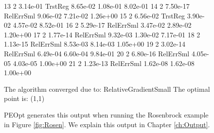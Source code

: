 \begin{figure}
\begin{lstPeopt}
13        2         3.14e-01  TrstReg   8.65e-02  1.08e-01  8.02e-01  
14        2         7.50e-17  RelErrSml 9.06e-02  7.21e-02  1.26e+00  
15        2         6.56e-02  TrstReg   3.90e-02  4.57e-02  8.52e-01  
16        2         5.29e-17  RelErrSml 3.47e-02  2.89e-02  1.20e+00  
17        2         1.77e-14  RelErrSml 9.32e-03  1.30e-02  7.17e-01  
18        2         1.13e-15  RelErrSml 8.53e-03  8.14e-03  1.05e+00  
19        2         3.02e-14  RelErrSml 6.49e-04  6.60e-04  9.84e-01  
20        2         6.80e-16  RelErrSml 4.05e-05  4.03e-05  1.00e+00  
21        2         1.23e-13  RelErrSml 1.62e-08  1.62e-08  1.00e+00
\end{lstPeopt}
    \begin{lstPeopt}
The algorithm converged due to: RelativeGradientSmall
The optimal point is: (1,1)
\end{lstPeopt}
    \caption{PEOpt generates this output when running the Rosenbrock example in Figure \ref{fig:Rosen}.  We explain this output in Chapter \ref{ch:Output}.}
    \label{fig:RosenOut}
\end{figure}

